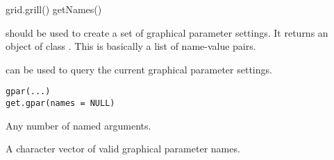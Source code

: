 \begin{Examples}
\begin{ExampleCode}
grid.grill()
getNames()
\end{ExampleCode}
\end{Examples}
%
\begin{Description}\relax
{} should be used to create a set of graphical
parameter settings.  It returns an object of class .  This is
basically a list of name-value pairs.

 can be used to query the current
graphical parameter settings.
\end{Description}
%
\begin{Usage}
\begin{verbatim}
gpar(...)
get.gpar(names = NULL)
\end{verbatim}
\end{Usage}
%
\begin{Arguments}
\begin{ldescription}
\item[\code{...}]  Any number of named arguments. 
\item[\code{names}] A character vector of valid graphical parameter names.
\end{ldescription}
\end{Arguments}
%
